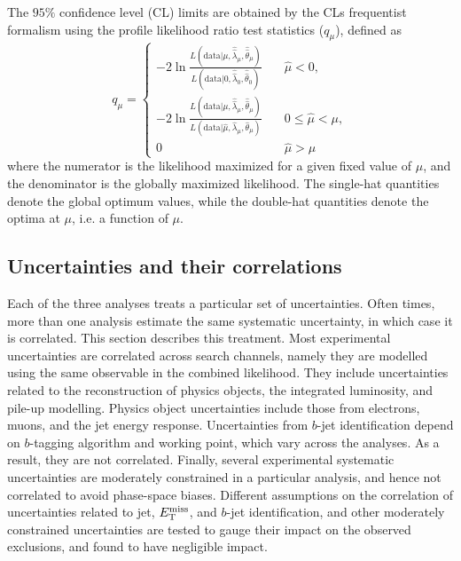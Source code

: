 The $95\%$ confidence level (CL) limits are obtained by the CLs frequentist formalism \cite{ReadCLs} using the profile likelihood ratio test statistics ($q_{\mu}$)\cite{Cowan:2010js}, defined as 
\begin{equation}
    \label{4.14}
    q_{\mu} = \begin{cases} 
     -2\ln\frac{L(\mathrm{data}|\mu,\hat{\hat{\lambda}}_{\mu},\hat{\hat{\theta}}_{\mu})}{L(\mathrm{data}|0,\hat{\hat{\lambda}}_{0},\hat{\hat{\theta}}_{0})}\quad &  \hat{\mu}<0, \\
        -2\ln\frac{L(\mathrm{data}|\mu,\hat{\hat{\lambda}}_{\mu},\hat{\hat{\theta}}_{\mu})}{L(\mathrm{data}|\hat{\mu},\hat{\lambda}_{\mu},\hat{\theta}_{\mu})}\quad & 0\le \hat{\mu}<\mu, \\
        0 \quad & \hat{\mu} > \mu
    \end{cases}
\end{equation}
where the numerator is the likelihood maximized for a given fixed value of $\mu$, and the denominator is the globally maximized likelihood. The single-hat quantities denote the global optimum values, while the double-hat quantities denote the optima at $\mu$, i.e. a function of $\mu$.


\subsection{Uncertainties and their correlations}

Each of the three analyses treats a particular set of uncertainties. Often times, more than one analysis estimate the same systematic uncertainty, in which case it is correlated. This section describes this treatment. Most experimental uncertainties are correlated across search channels, namely they are modelled using the same observable in the combined likelihood. They include uncertainties related to the reconstruction of physics objects, the integrated luminosity, and pile-up modelling. Physics object uncertainties include those from electrons, muons, and the jet energy response. Uncertainties from $b$-jet identification depend on $b$-tagging algorithm and working point, which vary across the analyses. As a result, they are not correlated. Finally, several experimental systematic uncertainties are moderately constrained in a particular analysis, and hence not correlated to avoid phase-space biases. Different assumptions on the correlation of uncertainties related to jet, $E_{\mathrm{T}}^{\mathrm{miss}}$, and $b$-jet identification, and other moderately constrained uncertainties are tested to gauge their impact on the observed exclusions, and found to have negligible impact. 

